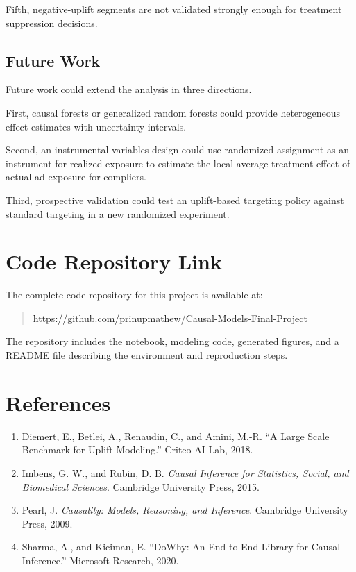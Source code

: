 \documentclass[journal,11pt,onecolumn]{IEEEtran}
\begin{document}
Fifth, negative-uplift segments are not validated strongly enough for treatment suppression decisions.

\subsection{Future Work}

Future work could extend the analysis in three directions.

First, causal forests or generalized random forests could provide heterogeneous effect estimates with uncertainty intervals.

Second, an instrumental variables design could use randomized assignment as an instrument for realized exposure to estimate the local average treatment effect of actual ad exposure for compliers.

Third, prospective validation could test an uplift-based targeting policy against standard targeting in a new randomized experiment.

\section{Code Repository Link}

The complete code repository for this project is available at:

\begin{quote}
    \url{https://github.com/prinupmathew/Causal-Models-Final-Project}
\end{quote}

The repository includes the notebook, modeling code, generated figures, and a README file describing the environment and reproduction steps.

\section*{References}

\begin{enumerate}
    \item Diemert, E., Betlei, A., Renaudin, C., and Amini, M.-R. ``A Large Scale Benchmark for Uplift Modeling.'' Criteo AI Lab, 2018.
    \item Imbens, G. W., and Rubin, D. B. \emph{Causal Inference for Statistics, Social, and Biomedical Sciences}. Cambridge University Press, 2015.
    \item Pearl, J. \emph{Causality: Models, Reasoning, and Inference}. Cambridge University Press, 2009.
    \item Sharma, A., and Kiciman, E. ``DoWhy: An End-to-End Library for Causal Inference.'' Microsoft Research, 2020.
\end{enumerate}
\end{document}
